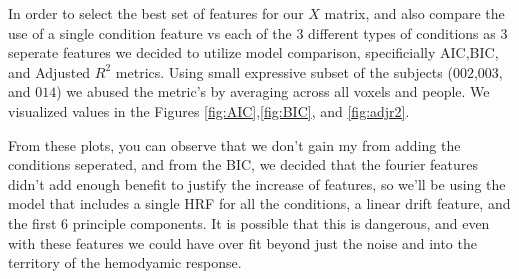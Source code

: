 \par In order to select the best set of features for our $X$ matrix, and also 
compare the use of a single condition feature vs each of the 3 different types
of conditions as 3 seperate features we decided to utilize model comparison, 
specificially AIC,BIC, and Adjusted $R^2$ metrics. Using small expressive
subset of the subjects ($002$,$003$, and $014$) we abused the metric's by
averaging across all voxels and people.  We visualized values in the Figures
\ref{fig:AIC},\ref{fig:BIC}, and \ref{fig:adjr2}.

\par From these plots, you can observe that we don't gain my from adding
the conditions seperated, and from the BIC, we decided that the fourier
features didn't add enough benefit to justify the increase of features, so we'll
be using the model that includes a single HRF for all the conditions, a linear
drift feature, and the first 6 principle components. It is possible that this is dangerous, 
and even with these features we could have over fit beyond just the noise and into 
the territory of the hemodyamic response.

%	
%


